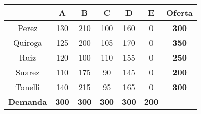     \begin{tabular}{ccccccc}
            & A       & B       & C       & D       & E       & \textbf{Oferta} \bigstrut[b]\\
    \hline
    \hline
    Perez   & 130     & 210     & 100     & 160     & 0       & \textbf{300} \bigstrut[t]\\
    Quiroga & 125     & 200     & 105     & 170     & 0       & \textbf{350} \\
    Ruiz    & 120     & 100     & 110     & 155     & 0       & \textbf{250} \\
    Suarez  & 110     & 175     & 90      & 145     & 0       & \textbf{200} \\
    Tonelli & 140     & 215     & 95      & 165     & 0       & \textbf{300} \bigstrut[b]\\
    \hline
    \hline
    \textbf{Demanda} & \textbf{300} & \textbf{300} & \textbf{300} & \textbf{300} & \textbf{200} &  \bigstrut[t]\\
    \end{tabular}%
